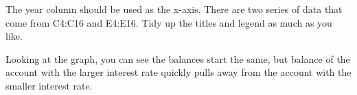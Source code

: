 The year column should be used as the x-axis. There are two series of
data that come from C4:C16 and E4:E16.  Tidy up the titles and legend
as much as you like.

Looking at the graph, you can see the balances start the same, but
balance of the account with the larger interest rate quickly pulls
away from the account with the smaller interest rate.
